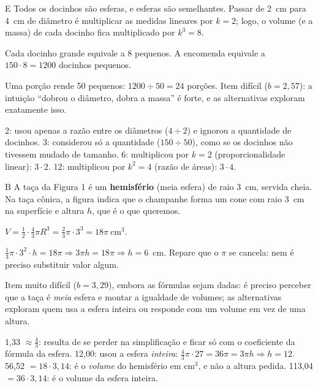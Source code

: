 \begin{resolucao}{E}
 Todos os docinhos são esferas, e esferas são semelhantes.
Passar de 2~cm para 4~cm de diâmetro é multiplicar as medidas lineares por
$k = 2$; logo, o volume (e a massa) de cada docinho fica multiplicado por
$k^3 = 8$.

 Cada docinho grande equivale a 8
pequenos. A encomenda equivale a $150\cdot 8 = 1200$ docinhos pequenos.

 Uma porção rende 50 pequenos:
$1200 \div 50 = 24$ porções. Item difícil ($b = 2{,}57$): a intuição “dobrou o
diâmetro, dobra a massa” é forte, e as alternativas exploram exatamente isso.

\begin{distratores}
 2: usou apenas a razão entre os diâmetros ($4\div 2$) e ignorou a
quantidade de docinhos.
 3: considerou só a quantidade ($150\div 50$), como se os docinhos não
tivessem mudado de tamanho.
 6: multiplicou por $k = 2$ (proporcionalidade linear): $3\cdot 2$.
 12: multiplicou por $k^2 = 4$ (razão de áreas): $3\cdot 4$.
\end{distratores}
\end{resolucao}

\begin{resolucao}{B}
 A taça da Figura 1 é um \textbf{hemisfério}
(meia esfera) de raio 3~cm, servida cheia. Na taça cônica, a figura indica que o
champanhe forma um cone com raio 3~cm na superfície e altura $h$, que é o que
queremos.

$V = \frac12\cdot\frac43\pi R^3 = \frac23\pi\cdot 3^3 = 18\pi\ \text{cm}^3$.

$\frac13\pi\cdot 3^2\cdot h = 18\pi \Rightarrow 3\pi h = 18\pi \Rightarrow h = 6$~cm.
Repare que o $\pi$ se cancela: nem é preciso substituir valor algum.

Item muito difícil ($b = 3{,}29$), embora as fórmulas sejam dadas: é preciso
perceber que a taça é \emph{meia} esfera e montar a igualdade de volumes; as
alternativas exploram quem usa a esfera inteira ou responde com um volume em vez
de uma altura.

\begin{distratores}
 1,33 $\approx \frac43$: resulta de se perder na simplificação e ficar só
com o coeficiente da fórmula da esfera.
 12,00: usou a esfera \emph{inteira}: $\frac43\pi\cdot 27 = 36\pi = 3\pi h
\Rightarrow h = 12$.
 56,52 $= 18\cdot 3{,}14$: é o \emph{volume} do hemisfério em cm$^3$, e não a
altura pedida.
 113,04 $= 36\cdot 3{,}14$: é o volume da esfera inteira.
\end{distratores}
\end{resolucao}

